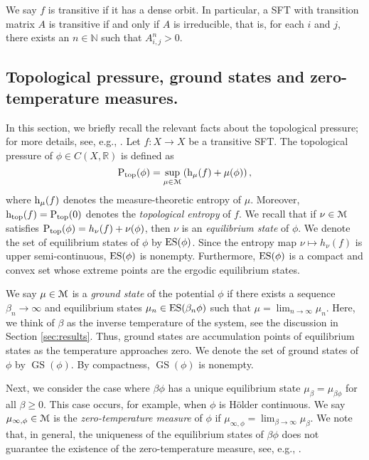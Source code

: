 \documentclass[11pt, reqno]{amsart}
\DeclareMathOperator{\GS}{GS}
\newcommand{\cM}{\EuScript{M}}
\newcommand{\bR}{{\mathbb R}}
\newcommand{\bN}{{\mathbb N}}
\def\h{{\text h}}
\def\Ptop{{\rm P_{\rm top}}}
\def\ES{{\rm ES}}
\begin{document}
We say  $f$ is transitive if it has a dense orbit. In particular, a SFT with transition matrix $A$ is transitive if and only if $A$ is irreducible, that is, for each $i$ and $j$, there exists an $n\in \bN$ such that $A^n_{i,j} > 0.$

\subsection{Topological pressure, ground states and zero-temperature measures.}
In this section, we briefly recall the relevant facts about the topological pressure; for more details, see, e.g., \cite {Wal:81}. Let $f:X\to X$ be a transitive SFT. The topological pressure of $\phi\in C(X,\bR)$ is defined as
 \begin{equation}\label{varprinciple}
 \Ptop(\phi)=\sup_{\mu\in \cM}\left(\h_\mu(f)+\mu(\phi)\right),
 \end{equation}
 where $\h_\mu(f)$ denotes the measure-theoretic entropy of $\mu$. Moreover, $\htop(f)=\Ptop(0)$ denotes the {\em topological entropy} of $f$.
We recall that if $\nu\in\cM$ satisfies $\Ptop(\phi)=h_\nu(f)+\nu(\phi)$, then $\nu$ is an \emph{equilibrium state} of $\phi$. We denote the set of equilibrium states of $\phi$ by $\ES(\phi)$. Since the entropy map $\nu\mapsto h_\nu(f)$ is upper semi-continuous, $\ES(\phi)$ is nonempty. Furthermore, $\ES(\phi)$ is a compact and convex set whose extreme points are the ergodic equilibrium states. 

We say  $\mu\in\cM$ is a {\em ground state} of the potential $\phi$ if there exists a sequence $\beta_n\to\infty$ and equilibrium states $\mu_{n}\in \ES(\beta_n\phi)$ such that $\mu=\lim_{n\to\infty}\mu_n$.  Here, we think of $\beta$ as the inverse temperature of the system, see the discussion in Section \ref{sec:results}. Thus, ground states are accumulation points of equilibrium states as the temperature approaches zero.  We denote the set of ground states of $\phi$ by $\GS(\phi)$.  By compactness, $\GS(\phi)$ is nonempty.

Next, we consider the case where $\beta\phi$ has a unique equilibrium state $\mu_\beta=\mu_{\beta\phi}$ for all $\beta\geq 0$.
This case occurs, for example, when $\phi$ is H\"older continuous.
We say $\mu_{\infty,\phi}\in \cM$ is the 
{\em zero-temperature measure} of $\phi$ if $\mu_{\infty,\phi}=\lim_{\beta\to \infty} \mu_{\beta}$.  We note that, in general, the uniqueness of the equilibrium states of $\beta \phi$ does not guarantee the existence of the zero-temperature measure, see, e.g., \cite{BGT,CH,CR}.
\end{document}
